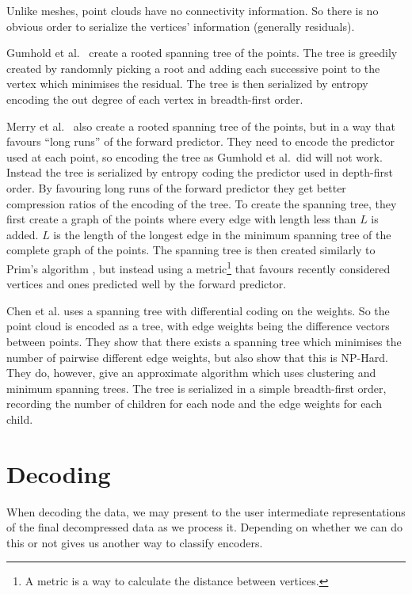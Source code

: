 \documentclass{report}
\begin{document}
Unlike meshes, point clouds have no connectivity information. So there is no
obvious order to serialize the vertices' information (generally residuals).

Gumhold et al.~\cite{gumholdcomp} create a rooted spanning tree of the
points. The tree is greedily created by randomnly picking a root and adding
each successive point to the vertex which minimises the residual. The tree is
then serialized by entropy encoding the out degree of each vertex in
breadth-first order.

Merry et al.~\cite{merrycomp} also create a rooted spanning tree of the
points, but in a way that favours ``long runs'' of the forward predictor. They
need to encode the predictor used at each point, so encoding the tree as
Gumhold et al.\ did will not work. Instead the tree is serialized by entropy
coding the predictor used in depth-first order. By favouring long runs of the
forward predictor they get better compression ratios of the encoding of the
tree. To create the spanning tree, they first create a graph of the points
where every edge with length less than $L$ is added. $L$ is the length of the
longest edge in the minimum spanning tree of the complete graph of the
points. The spanning tree is then created similarly to Prim's algorithm
\cite[p.\ 457]{sedgewick}, but instead using a metric\footnote{A metric is a
  way to calculate the distance between vertices.} that favours recently
considered vertices and ones predicted well by the forward predictor.

Chen et al.\cite{chen2005lcp} uses a spanning tree with differential coding on
the weights. So the point cloud is encoded as a tree, with edge weights being
the difference vectors between points. They show that there exists a spanning
tree which minimises the number of pairwise different edge weights, but also
show that this is NP-Hard. They do, however, give an approximate algorithm
which uses clustering and minimum spanning trees. The tree is serialized in a
simple breadth-first order, recording the number of children for each node and
the edge weights for each child.


\section{Decoding}

When decoding the data, we may present to the user intermediate
representations of the final decompressed data as we process it. Depending on
whether we can do this or not gives us another way to classify encoders.
\end{document}

